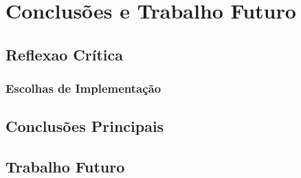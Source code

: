 \chapter{Conclusões e Trabalho Futuro}
\label{chap:conc-trab-futuro}

\section{Reflexao Crítica}
\subsection*{Escolhas de Implementação}
\subsection*{}
\subsection*{}

\section{Conclusões Principais}
\label{sec:conc-princ}


\section{Trabalho Futuro}
\label{sec:trab-futuro}

